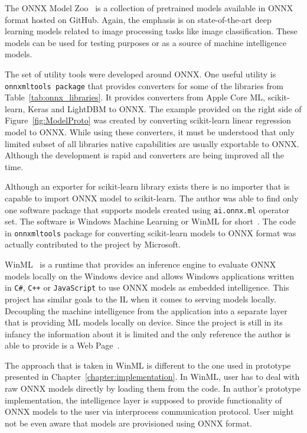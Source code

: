 \documentclass[english, 12pt, a4paper, elec, utf8, online]{aaltothesis}
\begin{document}
The ONNX Model Zoo~\cite{onnx_model_zoo} is a collection of pretrained models available in ONNX format hosted on GitHub. Again, the emphasis is on state-of-the-art deep learning models related to image processing tasks like image classification. These models can be used for testing purposes or as a source of machine intelligence models.            

The set of utility tools were developed around ONNX. One useful utility is \texttt{onnxmltools package} that provides converters for some of the libraries from Table~\ref{tab:onnx_libraries}. It provides converters from Apple Core ML, scikit-learn, Keras and LightDBM to ONNX. The example provided on the right side of Figure~\ref{fig:ModelProto} was created by converting scikit-learn linear regression model to ONNX. While using these converters, it must be understood that only limited subset of all libraries native capabilities are usually exportable to ONNX. Although the development is rapid and converters are being improved all the time.

Although an exporter for scikit-learn library exists there is no importer that is capable to import ONNX model to scikit-learn. The author was able to find only one software package that supports models created using \texttt{ai.onnx.ml} operator set. The software is Windows Machine Learning or WinML for short~\cite{winml}. The code in \texttt{onnxmltools} package for converting scikit-learn models to ONNX format was actually contributed to the project by Microsoft. 

WinML~\cite{winml} is a runtime that provides an inference engine to evaluate ONNX models locally on the Windows device and allows Windows applications written in \texttt{C\#}, \texttt{C++} or \texttt{JavaScript} to use ONNX models as embedded intelligence. This project has similar goals to the IL when it comes to serving models locally. Decoupling the machine intelligence from the application into a separate layer that is providing ML models locally on device. Since the project is still in its infancy the information about it is limited and the only reference the author is able to provide is a Web Page~\cite{winml}.

The approach that is taken in WinML is different to the one used in prototype presented in Chapter~\ref{chapter:implementation}. In WinML, user has to deal with raw ONNX models directly by loading them from the code. In author's prototype implementation, the intelligence layer is supposed to provide functionality of ONNX models to the user via interprocess communication protocol. User might not be even aware that models are provisioned using ONNX format. 
\end{document}
